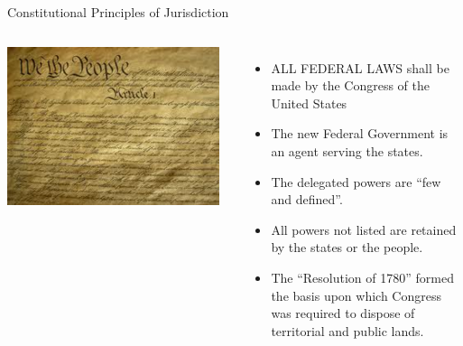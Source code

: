 \begin{frame}{Constitutional Principles of Jurisdiction}
    \begin{columns}[onlytextwidth]
            \centering
            \includegraphics[width=0.95\textwidth]{img/constitution.png} \\

            \begin{itemize}
                \item ALL FEDERAL LAWS shall be made by the Congress of the United States
                \item The new Federal Government is an agent serving the states.
                \item The delegated powers are “few and defined”. 
                \item All powers not listed are retained by the states or the people.
                \item The “Resolution of 1780”  formed the basis upon which Congress was required to dispose of territorial and public lands.
            \end{itemize}
    \end{columns}
\end{frame}


